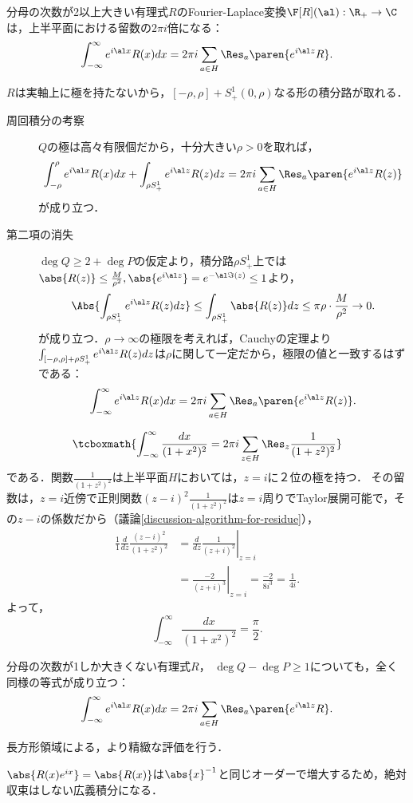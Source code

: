 \documentclass[uplatex, dvipdfmx]{jsreport}
\begin{document}
\begin{proposition}
    分母の次数が2以上大きい有理式$R$のFourier-Laplace変換$\F[R](\al):\R_+\to\C$は，上半平面における留数の$2\pi i$倍になる：
    \[\int^\infty_{-\infty}e^{i\al x}R(x)dx=2\pi i\sum_{a\in H}\Res_a\paren{e^{i\al z}R}.\]
\end{proposition}
\begin{Proof}
    $R$は実軸上に極を持たないから，$[-\rho,\rho]+S^1_+(0,\rho)$なる形の積分路が取れる．
    \begin{description}
        \item[周回積分の考察] $Q$の極は高々有限個だから，十分大きい$\rho>0$を取れば，
        \[\int^\rho_{-\rho}e^{i\al x}R(x)dx+\int_{\rho S^1_+}e^{i\al z}R(z)dz=2\pi i\sum_{a\in H}\Res_a\paren{e^{i\al z}R(z)}\]
        が成り立つ．
        \item[第二項の消失] $\deg Q\ge 2+\deg P$の仮定より，積分路$\rho S^1_+$上では$\abs{R(z)}\le\frac{M}{\rho^2},\abs{e^{i\al z}}=e^{-\al\Im(z)}\le1$より，
        \[\Abs{\int_{\rho S^1_+}e^{i\al z}R(z)dz}\le\int_{\rho S^1_+}\abs{R(z)}dz\le\pi\rho\cdot\frac{M}{\rho^2}\to0.\]
        が成り立つ．$\rho\to\infty$の極限を考えれば，Cauchyの定理より$\int_{[-\rho,\rho]+\rho S^1_+}e^{i\al z}R(z)dz$は$\rho$に関して一定だから，極限の値と一致するはずである：
        \[\int^\infty_{-\infty}e^{i\al z}R(x)dx=2\pi i\sum_{a\in H}\Res_a\paren{e^{i\al z}R(z)}.\]
    \end{description}
\end{Proof}

\begin{example}
    \[\tcboxmath{\int^\infty_{-\infty}\frac{dx}{(1+x^2)^2}=2\pi i\sum_{z\in H}\Res_z\frac{1}{(1+z^2)^2}}\]
    である．関数$\frac{1}{(1+z^2)^2}$は上半平面$H$においては，$z=i$に２位の極を持つ．
    その留数は，$z=i$近傍で正則関数$(z-i)^2\frac{1}{(1+z^2)^2}$は$z=i$周りでTaylor展開可能で，その$z-i$の係数だから（議論\ref{discussion-algorithm-for-residue}），
    \begin{align*}
        \frac{1}{1}\frac{d}{dz}\frac{(z-i)^2}{(1+z^2)^2}&=\left.\frac{d}{dz}\frac{1}{(z+i)^2}\right|_{z=i}\\
        &=\left.\frac{-2}{(z+i)^3}\right|_{z=i}=\frac{-2}{8i^3}=\frac{1}{4i}.
    \end{align*}
    よって，
    \[\int^\infty_{-\infty}\frac{dx}{(1+x^2)^2}=\frac{\pi}{2}.\]
\end{example}

\begin{proposition}
    分母の次数が1しか大きくない有理式$R$，
    $\deg Q-\deg P\ge1$についても，全く同様の等式が成り立つ：
    \[\int^\infty_{-\infty}e^{i\al x}R(x)dx=2\pi i\sum_{a\in H}\Res_a\paren{e^{i\al z}R}.\]
\end{proposition}
\begin{Proof}
    長方形領域による，より精緻な評価を行う．
\end{Proof}
\begin{remarks}
    $\abs{R(x)e^{ix}}=\abs{R(x)}$は$\abs{x}^{-1}$と同じオーダーで増大するため，絶対収束はしない広義積分になる．
\end{remarks}
\end{document}
